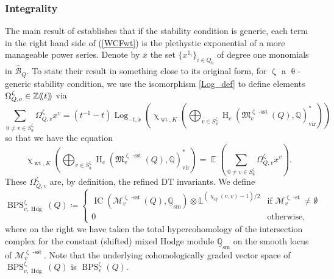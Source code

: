 \documentclass{amsart}
\DeclareMathOperator{\sst}{-sst}
\DeclareMathOperator{\IC}{IC}
\newcommand{\Msp}{\mathcal{M}}
\newcommand{\Mst}{\mathfrak{M}}
\newcommand{\LL}{\mathbb{L}}
\newcommand{\QQ}{\mathbb{Q}}
\DeclareMathOperator{\Wt}{wt}
\DeclareMathOperator{\HO}{H}
\DeclareMathOperator{\sstable}{-sst}
\DeclareMathOperator{\BPS}{BPS}
\DeclareMathOperator{\stable}{-st}
\DeclareMathOperator{\vir}{vir}
\DeclareMathOperator{\EE}{\mathbb{E}}
\newcommand{\lcbs}{(\!(}
\newcommand{\rcbs}{)\!)}
\DeclareMathOperator{\Log}{Log}
\DeclareMathOperator{\Hodge}{Hdg}
\def\!{\mskip-\thinmuskip}
\newcommand{\g}[1]{1_{#1}}
\renewcommand{\theta}{\uptheta}
\renewcommand{\zeta}{\upzeta}
\renewcommand{\chi}{\upchi}
\theoremstyle{plain}%
\theoremstyle{definition}
\theoremstyle{remark}
\begin{document}
\subsubsection{Integrality}
The main result of \cite{MeiRei} establishes that if the stability condition is generic, each term in the right hand side of (\ref{WCFwt}) is the plethystic exponential of a more manageable power series.  Denote by $\overline{x}$ the set $\{x^{\g{i}}\}_{i\in Q_0}$ of degree one monomials in $\hat{\mathscr{B}}_Q$.  To state their result in something close to its original form, for $\zeta$ a $\theta$-generic stability condition, we use the isomorphism \eqref{Log_def} to define elements $\Omega_{Q,v}^{\zeta}\in \mathbb{Z}\lcbs t\rcbs$ via
\[
\sum_{0\neq v\in S^{\zeta}_{\theta}} \Omega_{Q,v}^{\zeta}x^v=(t^{-1}-t)\Log_{-t,\overline{x}}\left(\chi_{\Wt,K}\left(\bigoplus_{v\in S^{\zeta}_{\theta}}\HO_c(\Mst^{\zeta\sstable}_{v}(Q),\QQ)_{\vir}^*\right)\right)
\]
so that we have the equation
\begin{equation}\label{OmegaDef}
\chi_{\Wt,K}\left(\bigoplus_{v\in S^{\zeta}_{\theta}}\HO_c(\Mst^{\zeta\sstable}_{v}(Q),\QQ)_{\vir}^*\right)=\EE\left(\sum_{0\neq v\in S^{\zeta}_{\theta}} \Omega_{Q,v}^{\zeta}x^v\right).
\end{equation}
These $\Omega_{Q,v}^{\zeta}$ are, by definition, the refined DT invariants.  We define 
\[
\BPS^{\zeta}_{v,\Hodge}(Q)\coloneqq \begin{cases} \IC(\Msp_v^{\zeta\sst}(Q),\underline{\mathbb{Q}}_{\textrm{sm}})\otimes\LL^{(\chi_Q(v,v)-1)/2} &\textrm{if }\Msp^{\zeta\stable}_v\neq \emptyset\\
0& \textrm{otherwise},\end{cases}
\]
where on the right we have taken the total hypercohomology of the intersection complex for the constant (shifted) mixed Hodge module $\underline{\QQ}_{\textrm{sm}}$ on the smooth locus of $\Msp_v^{\zeta\sstable}$.  Note that the underlying cohomologically graded vector space of $\BPS^{\zeta}_{v,\Hodge}(Q)$ is $\BPS^{\zeta}_{v}(Q)$.
\end{document}
